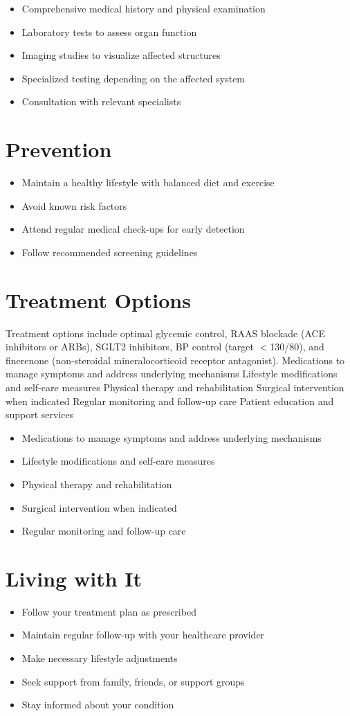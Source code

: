 \begin{itemize}[noitemsep]
  \item Comprehensive medical history and physical examination
  \item Laboratory tests to assess organ function
  \item Imaging studies to visualize affected structures
  \item Specialized testing depending on the affected system
  \item Consultation with relevant specialists
\end{itemize}
\section{Prevention}
\begin{itemize}[noitemsep]
  \item Maintain a healthy lifestyle with balanced diet and exercise
  \item Avoid known risk factors
  \item Attend regular medical check-ups for early detection
  \item Follow recommended screening guidelines
\end{itemize}
\section{Treatment Options}
Treatment options include optimal glycemic control, RAAS blockade (ACE inhibitors or ARBs), SGLT2 inhibitors, BP control (target $<$130/80), and finerenone (non-steroidal mineralocorticoid receptor antagonist). Medications to manage symptoms and address underlying mechanisms Lifestyle modifications and self-care measures Physical therapy and rehabilitation Surgical intervention when indicated Regular monitoring and follow-up care Patient education and support services

\begin{itemize}[noitemsep]
  \item Medications to manage symptoms and address underlying mechanisms
  \item Lifestyle modifications and self-care measures
  \item Physical therapy and rehabilitation
  \item Surgical intervention when indicated
  \item Regular monitoring and follow-up care
\end{itemize}
\section{Living with It}
\begin{itemize}[noitemsep]
  \item Follow your treatment plan as prescribed
  \item Maintain regular follow-up with your healthcare provider
  \item Make necessary lifestyle adjustments
  \item Seek support from family, friends, or support groups
  \item Stay informed about your condition
\end{itemize}
